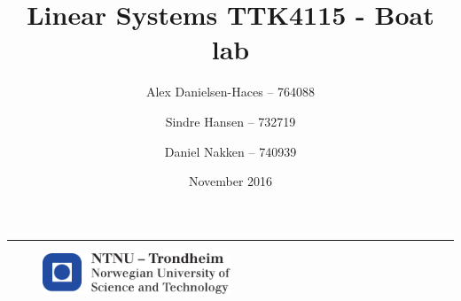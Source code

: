 \documentclass[a4paper]{article}
\title{Linear Systems TTK4115 - Boat lab}
\author{
  Alex Danielsen-Haces -- 764088 \and
  Sindre Hansen -- 732719 \and
  Daniel Nakken -- 740939}
\date{November 2016}
\begin{document}
\begin{titlepage}
    \maketitle
    \rule{\linewidth}{0.5mm}
    \begin{figure}
    \centering
    \includegraphics[width=0.5\textwidth]{images/logontnu_eng}
    \end{figure}
    \thispagestyle{empty}
\end{titlepage} 
\tableofcontents
\thispagestyle{empty} %
\newpage
\setcounter{page}{1}

\newpage

\newpage

\newpage

\newpage

\newpage

\end{document}
